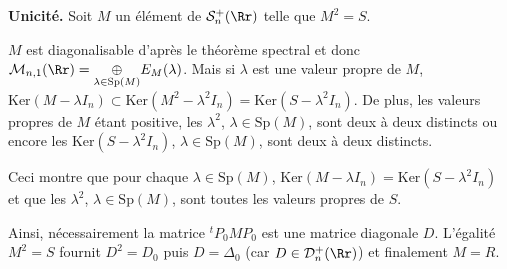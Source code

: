 {\begin{enumerate}
{\textbf{Unicité.} Soit $M$ un élément de $\mathcal{S}_n^+(\Rr)$ telle que $M^2 = S$.

$M$ est diagonalisable d'après le théorème spectral et donc $\mathcal{M}_{n,1}(\Rr)=\underset{\lambda\in\text{Sp}(M)}{\oplus}E_M(\lambda)$. Mais si $\lambda$ est une valeur propre de $M$, $\text{Ker}(M-\lambda I_n)\subset\text{Ker}(M^2-\lambda^2I_n)=\text{Ker}(S-\lambda^2I_n)$. De plus, les valeurs propres de $M$ étant positive, les $\lambda^2$, $\lambda\in\text{Sp}(M)$, sont deux à deux distincts ou encore les $\text{Ker}(S-\lambda^2I_n)$, $\lambda\in\text{Sp}(M)$, sont deux à deux distincts.

Ceci montre que pour chaque $\lambda\in\text{Sp}(M)$, $\text{Ker}(M-\lambda I_n)=\text{Ker}(S-\lambda^2I_n)$ et que les $\lambda^2$, $\lambda\in\text{Sp}(M)$, sont toutes les valeurs propres de $S$.

Ainsi, nécessairement la matrice ${^t}P_0MP_0$ est une matrice diagonale $D$. L'égalité $M^2=S$ fournit $D^2=D_0$ puis $D=\Delta_0$ (car $D\in\mathcal{D}_n^+(\Rr)$) et finalement $M = R$.

\begin{center}
\end{center}}
\end{enumerate}
}